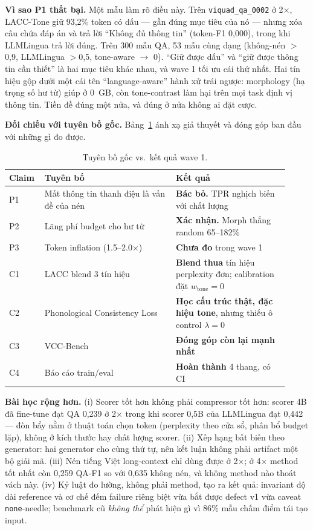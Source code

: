 \documentclass[runningheads]{llncs}
\begin{document}
\textbf{Vì sao P1 thất bại.} Một mẫu làm rõ điều này. Trên \texttt{viquad\_qa\_0002} ở 2$\times$, LACC-Tone giữ 93,2\% token có dấu --- gần đúng mục tiêu của nó --- nhưng xóa câu chứa đáp án và trả lời ``Không đủ thông tin'' (token-F1 0,000), trong khi LLMLingua trả lời đúng. Trên 300 mẫu QA, 53 mẫu cùng dạng (không-nén $>$0,9, LLMLingua $>$0,5, tone-aware $\to$ 0). ``Giữ được dấu'' và ``giữ được thông tin cần thiết'' là hai mục tiêu khác nhau, và wave 1 tối ưu cái thứ nhất. Hai tín hiệu gộp dưới một cái tên ``language-aware'' hành xử trái ngược: morphology (hạ trọng số hư từ) giúp ở 0~GB, còn tone-contrast làm hại trên mọi task định vị thông tin. Tiền đề đúng một nửa, và đúng ở nửa không ai đặt cược.

\textbf{Đối chiếu với tuyên bố gốc.} Bảng~\ref{tab:reconcile} ánh xạ giả thuyết và đóng góp ban đầu với những gì đo được.

\begin{table}[H]
\centering
\caption{Tuyên bố gốc vs.\ kết quả wave 1.}
\label{tab:reconcile}
\begin{tabular}{p{0.10\linewidth}p{0.44\linewidth}p{0.38\linewidth}}
\toprule
\textbf{Claim} & \textbf{Tuyên bố} & \textbf{Kết quả} \\
\midrule
P1 & Mất thông tin thanh điệu là vấn đề của nén & \textbf{Bác bỏ.} TPR nghịch biến với chất lượng \\
P2 & Lãng phí budget cho hư từ & \textbf{Xác nhận.} Morph thắng random 65--182\% \\
P3 & Token inflation (1.5--2.0$\times$) & \textbf{Chưa đo} trong wave 1 \\
C1 & LACC blend 3 tín hiệu & \textbf{Blend thua} tín hiệu perplexity đơn; calibration đặt $w_{\text{tone}}{=}0$ \\
C2 & Phonological Consistency Loss & \textbf{Học cấu trúc thật, đặc hiệu tone}, nhưng thiếu ô control $\lambda{=}0$ \\
C3 & VCC-Bench & \textbf{Đóng góp còn lại mạnh nhất} \\
C4 & Báo cáo train/eval & \textbf{Hoàn thành} 4 thang, có CI \\
\bottomrule
\end{tabular}
\end{table}

\textbf{Bài học rộng hơn.} (i) Scorer tốt hơn không phải compressor tốt hơn: scorer 4B đã fine-tune đạt QA 0,239 ở 2$\times$ trong khi scorer 0,5B của LLMLingua đạt 0,442 --- đòn bẩy nằm ở thuật toán chọn token (perplexity theo cửa sổ, phân bổ budget lặp), không ở kích thước hay chất lượng scorer. (ii) Xếp hạng bất biến theo generator: hai generator cho cùng thứ tự, nên kết luận không phải artifact một bộ giải mã. (iii) Nén tiếng Việt long-context chỉ dùng được ở 2$\times$; ở 4$\times$ method tốt nhất còn 0,259 QA-F1 so với 0,635 không nén, và không method nào thoát vách này. (iv) Kỷ luật đo lường, không phải method, tạo ra kết quả: invariant độ dài reference và cơ chế đếm failure riêng biệt vừa bắt được defect v1 vừa caveat \texttt{none}-needle; benchmark cũ \emph{không thể} phát hiện gì vì 86\% mẫu chấm điểm tái tạo input.
\end{document}
